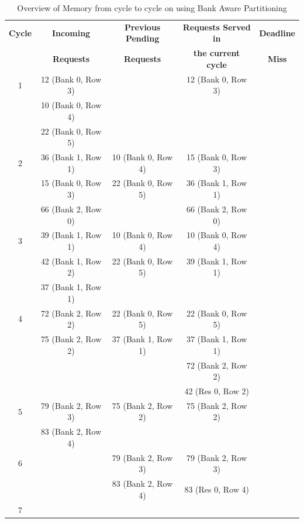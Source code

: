 \begin{table}[t]
 \begin{tabular}{|c|c|c|c|c|}\hline
 {\bf Cycle} & {\bf Incoming} & {\bf Previous Pending} & {\bf Requests Served in} & {\bf Deadline} \\ 
       & {\bf Requests}  & {\bf Requests}         & {\bf the current cycle} & {\bf Miss} \\ \hline      
 1 & 12 (Bank 0, Row 3) & & 12 (Bank 0, Row 3) &  \\ 
   & 10 (Bank 0, Row 4) & & & \\ 
   & 22 (Bank 0, Row 5) & & & \\ \hline
 2 & 36 (Bank 1, Row 1) & 10 (Bank 0, Row 4) & 15 (Bank 0, Row 3) & \\ 
   & 15 (Bank 0, Row 3) & 22 (Bank 0, Row 5) & 36 (Bank 1, Row 1) & \\
   & 66 (Bank 2, Row 0) &                    & 66 (Bank 2, Row 0) & \\ \hline
 3 & 39 (Bank 1, Row 1) & 10 (Bank 0, Row 4) & 10 (Bank 0, Row 4) & \\
   & 42 (Bank 1, Row 2) & 22 (Bank 0, Row 5) & 39 (Bank 1, Row 1) & \\
   & 37 (Bank 1, Row 1) &                    &                    & \\ \hline
 4 & 72 (Bank 2, Row 2) & 22 (Bank 0, Row 5) & 22 (Bank 0, Row 5) & \\
   & 75 (Bank 2, Row 2) & 37 (Bank 1, Row 1) & 37 (Bank 1, Row 1) & \\ 
   &                    &                    & 72 (Bank 2, Row 2) & \\ 
   &                    &                    & 42 (Res 0, Row 2)  & \\ \hline
 5 & 79 (Bank 2, Row 3) & 75 (Bank 2, Row 2) & 75 (Bank 2, Row 2) & \\ 
   & 83 (Bank 2, Row 4) &                    &                    & \\ \hline
 6 &                    & 79 (Bank 2, Row 3) & 79 (Bank 2, Row 3) &  \\ 
   &                    & 83 (Bank 2, Row 4) & 83 (Res 0, Row 4)  &   \\ \hline
 7 &                    &                     &                   &  \\ \hline
 \end{tabular}
\caption{Overview of Memory from cycle to cycle on using Bank Aware Partitioning}
\label{tab10}
\end{table}


